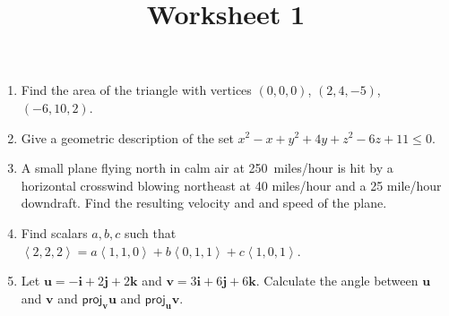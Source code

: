 \documentclass[12pt]{article}
\title{Worksheet 1}
\author{}\date{}
\begin{document}
\maketitle

\begin{enumerate}
\item Find the area of the triangle with vertices
$\left(0,0,0\right)$, $\left(2,4,-5\right)$,
$\left(-6,10,2\right)$. %

\item Give a geometric description of the set
$x^2-x+y^2+4y+z^2-6z+11\le 0$.

\item A small plane flying north in calm air at
250~miles/hour is hit by a horizontal crosswind blowing
northeast at 40 miles/hour and a 25 mile/hour downdraft.
Find the resulting velocity and and speed of the plane.
\item Find scalars $a,b,c$ such that
$\left\langle 2,2,2\right\rangle
=a\left\langle 1,1,0\right\rangle
+b\left\langle 0,1,1\right\rangle
+c\left\langle 1,0,1\right\rangle$.

\item Let $\mathbold{u}=-\mathbold{i}+2\mathbold{j}+2\mathbold{k}$
and $\mathbold{v}=3\mathbold{i}+6\mathbold{j}+6\mathbold{k}$.
Calculate the angle between $\mathbold{u}$ and $\mathbold{v}$
and $\mathsf{proj}_\mathbold{v}\mathbold{u}$
and $\mathsf{proj}_\mathbold{u}\mathbold{v}$.


\end{enumerate}
\end{document}

